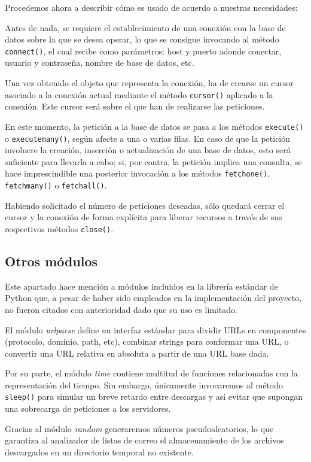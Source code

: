 Procedemos ahora a describir cómo es usado de acuerdo a nuestras necesidades:

Antes de nada, se requiere el establecimiento de una conexión con la base
de datos sobre la que se desea operar, lo que se consigue invocando al método
\texttt{connect()}, el cual recibe como parámetros: host y puerto adonde
conectar, usuario y contraseña, nombre de base de datos, etc.

Una vez obtenido el objeto que representa la conexión, ha de crearse un cursor
asociado a la conexión actual mediante el método \texttt{cursor()} aplicado
a la conexión. Este cursor será sobre el que han de realizarse las peticiones.

En este momento, la petición a la base de datos se pasa a los métodos
\texttt{execute()} o \texttt{executemany()}, según afecte a una o varias filas.
En caso de que la petición involucre la creación, inserción o actualización
de una base de datos, esto será suficiente para llevarla a cabo; si, por contra,
la petición implica una consulta, se hace imprescindible una posterior
invocación a los métodos \texttt{fetchone()}, \texttt{fetchmany()} o
\texttt{fetchall()}.

Habiendo solicitado el número de peticiones deseadas, sólo quedará cerrar
el cursor y la conexión de forma explícita para liberar recursos a través de
sus respectivos métodos \texttt{close()}.


\subsection{Otros módulos}
Este apartado hace mención a módulos incluidos en la librería estándar de
Python que, a pesar de haber sido empleados en la implementación del proyecto,
no fueron citados con anterioridad dado que su uso es limitado.

El módulo \textit{urlparse} define un interfaz estándar para dividir URLs en
componentes (protocolo, dominio, path, etc), combinar strings para conformar
una URL, o convertir una URL relativa en absoluta a partir de una URL base
dada.

Por su parte, el módulo \textit{time} contiene multitud de funciones
relacionadas con la representación del tiempo. Sin embargo, únicamente
invocaremos al método \texttt{sleep()} para simular un breve retardo entre
descargas y así evitar que supongan una sobrecarga de peticiones a los
servidores.

Gracias al módulo \textit{random} generaremos números pseudoaleatorios, lo
que garantiza al analizador de listas de correo el almacenamiento de los
archivos descargados en un directorio temporal no existente.

